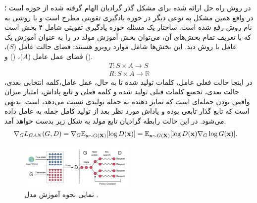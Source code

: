 \subsubsection*{}  \label{chap2:seqgan}
در روش  راه حل ارائه شده برای مشکل گذر گرادیان الهام گرفته شده از حوزه  است \cite{seqgan}؛ در واقع همین مشکل به نوعی دیگر در حوزه یادگیری تقویتی مطرح است و با روشی به نام روش  رفع شده است. ساختار یک مسئله حوزه یادگیری تقویتی شامل ۴ بخش است که با تعریف تمام بخش‌های آن، ‌می‌توان بخش آموزش مولد در \gan{} را به عنوان آموزش یک عامل با روش \reinforce{} دید. این بخش‌ها شامل موارد روبرو هستند: فضای حالت عامل ($S$)، فضای عمل عامل ($A$)، 
()
و 
().
\begin{equation}\begin{split}
		\nonumber
		T: S \times A \rightarrow S\\
		R: S \times A \rightarrow \mathbb{R}
	\end{split}\end{equation}
در اینجا حالت فعلی عامل،  کلمات تولید شده تا به حال، عمل عامل،‌کلمه انتخابی بعدی، حالت بعدی، تجمیع کلمات قبلی تولید شده و کلمه فعلی و تابع پاداش، امتیاز میزان واقعی بودن جمله‌ای است که تمایز دهنده به جمله تولیدی نسبت می‌دهد، است. بدیهی است که تابع گذار تابعی  بوده و پاداش مورد نظر بعد از تولید کامل جمله به عامل داده می‌شود. در این حالت رابطه گرادیان تابع مولد به شکل زیر بدست خواهد آمد.
\begin{equation} \label{eq:seqgan-grad}
	\begin{split}
		\nabla_G L_{GAN} (G, D) &= \nabla_G \expected_{\bff{x} \sim G(\bff{X})} [\log D(\bff{x})]= \expected_{\bff{x} \sim G(\bff{X})} [\log D(\bff{x}) \nabla_G \log G(\bff{x})].
	\end{split}
\end{equation}

\begin{figure}[t]
	\centering
	\includegraphics[width=0.5\textwidth]{images/seq-gan.png}
	\caption{
		نمایی نحوه آموزش مدل 
		\cite{seqgan}.}
	\label{fig:seq-gan}
\end{figure}

